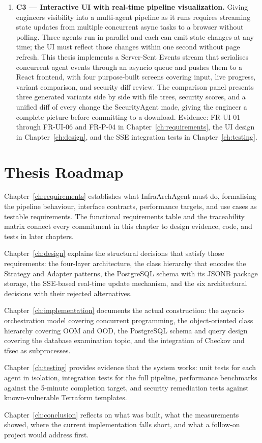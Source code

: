 \begin{enumerate}
  \item \textbf{C3 --- Interactive UI with real-time pipeline visualization.}
    Giving engineers visibility into a multi-agent pipeline as it runs
    requires streaming state updates from multiple concurrent async tasks
    to a browser without polling. Three agents run in parallel and each
    can emit state changes at any time; the UI must reflect those changes
    within one second without page refresh. This thesis implements a
    Server-Sent Events stream that serialises concurrent agent events
    through an asyncio queue and pushes them to a React frontend, with
    four purpose-built screens covering input, live progress, variant
    comparison, and security diff review. The comparison panel presents
    three generated variants side by side with file trees, security scores,
    and a unified diff of every change the SecurityAgent made, giving
    the engineer a complete picture before committing to a download.
    Evidence: FR-UI-01 through FR-UI-06 and FR-P-04 in
    Chapter~\ref{ch:requirements}, the UI design in
    Chapter~\ref{ch:design}, and the SSE integration tests in
    Chapter~\ref{ch:testing}.

\end{enumerate}

\EvidenceTable

\section{Thesis Roadmap}
\label{sec:roadmap}

Chapter~\ref{ch:requirements} establishes what InfraArchAgent must do,
formalising the pipeline behaviour, interface contracts, performance targets,
and use cases as testable requirements. The functional requirements table
and the traceability matrix connect every commitment in this chapter to
design evidence, code, and tests in later chapters.

Chapter~\ref{ch:design} explains the structural decisions that satisfy
those requirements: the four-layer architecture, the class hierarchy that
encodes the Strategy and Adapter patterns, the PostgreSQL schema with its
JSONB package storage, the SSE-based real-time update mechanism, and the
six architectural decisions with their rejected alternatives.

Chapter~\ref{ch:implementation} documents the actual construction: the
asyncio orchestration model covering concurrent programming, the
object-oriented class hierarchy covering OOM and OOD, the PostgreSQL schema
and query design covering the database examination topic, and the integration
of Checkov and tfsec as subprocesses.

Chapter~\ref{ch:testing} provides evidence that the system works: unit
tests for each agent in isolation, integration tests for the full pipeline,
performance benchmarks against the 5-minute completion target, and security
remediation tests against known-vulnerable Terraform templates.

Chapter~\ref{ch:conclusion} reflects on what was built, what the
measurements showed, where the current implementation falls short, and
what a follow-on project would address first.